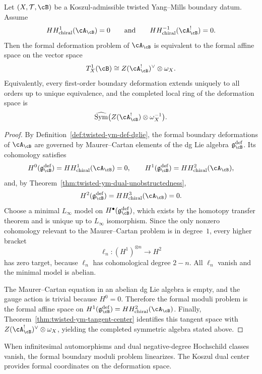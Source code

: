 \begin{theorem}
\label{thm:twisted-ym-central-formality}
Let $(X,\mathcal{T},\cB)$ be a Koszul-admissible twisted Yang--Mills boundary datum. Assume
\[
HH^{1}_{\mathrm{chiral}}(\cA_{\cB}) = 0
\qquad\text{and}\qquad
HH^{-1}_{\mathrm{chiral}}(\cA_{\cB}^{!}) = 0.
\]
Then the formal deformation problem of $\cA_{\cB}$ is equivalent to the formal affine space on the vector space
\[
T^1_X(\cB)
\cong
Z(\cA_{\cB}^{!})^{\vee}\otimes \omega_X.
\]
Equivalently, every first-order boundary deformation extends uniquely to all orders up to unique equivalence, and the completed local ring of the deformation space is
\[
\widehat{\mathrm{Sym}}\bigl(Z(\cA_{\cB}^{!})\otimes \omega_X^{-1}\bigr).
\]
\end{theorem}

\begin{proof}
By Definition~\ref{def:twisted-ym-def-dglie}, the formal boundary
deformations of $\cA_{\cB}$ are governed by Maurer--Cartan elements of
the dg Lie algebra $\mathfrak{g}^{\mathrm{def}}_{\cB}$. Its cohomology
satisfies
\[
H^0(\mathfrak{g}^{\mathrm{def}}_{\cB}) = HH^{1}_{\mathrm{chiral}}(\cA_{\cB}) = 0,
\qquad
H^1(\mathfrak{g}^{\mathrm{def}}_{\cB}) = HH^{2}_{\mathrm{chiral}}(\cA_{\cB}),
\]
and, by Theorem~\ref{thm:twisted-ym-dual-unobstructedness},
\[
H^2(\mathfrak{g}^{\mathrm{def}}_{\cB}) = HH^{3}_{\mathrm{chiral}}(\cA_{\cB}) = 0.
\]
Choose a minimal $L_\infty$ model on $H^\bullet(\mathfrak{g}^{\mathrm{def}}_{\cB})$, which exists by the homotopy transfer theorem and is unique up to $L_\infty$ isomorphism. Since the only nonzero cohomology relevant to the Maurer--Cartan problem is in degree~$1$, every higher bracket
\[
\ell_n \colon (H^1)^{\otimes n} \longrightarrow H^{2}
\]
has zero target, because $\ell_n$ has cohomological degree $2-n$. All $\ell_n$ vanish and the minimal model is abelian.

The Maurer--Cartan equation in an abelian dg Lie algebra is empty, and the gauge action is trivial because $H^0=0$. Therefore the formal moduli problem is the formal affine space on $H^1(\mathfrak{g}^{\mathrm{def}}_{\cB}) = HH^2_{\mathrm{chiral}}(\cA_{\cB})$. Finally, Theorem~\ref{thm:twisted-ym-tangent-center} identifies this tangent space with $Z(\cA_{\cB}^{!})^{\vee}\otimes\omega_X$, yielding the completed symmetric algebra stated above.
\end{proof}

\begin{remark}[Interpretation]
\label{rem:twisted-ym-central-formality-meaning}
When infinitesimal automorphisms and dual negative-degree Hochschild classes vanish, the formal boundary moduli problem linearizes. The Koszul dual center provides formal coordinates on the deformation space.
\end{remark}

